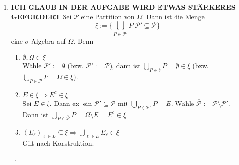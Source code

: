 \documentclass[11pt,a4paper,ngerman]{article}
\begin{document}
\begin{enumerate}[a)]
\begin{enumerate}[(1)]
\item \textbf{ICH GLAUB IN DER AUFGABE WIRD ETWAS STÄRKERES GEFORDERT}
Sei $\mathcal{P}$ eine Partition von $\Omega$. Dann ist die Menge
\begin{equation*}\xi := \{ \bigcup_{P \in \mathcal{P'}} P | \mathcal{P'} \subseteq \mathcal{P} \} \end{equation*}
eine $\sigma$-Algebra auf $\Omega$. Denn

\begin{enumerate}[(1)]
\item $\emptyset, \Omega \in \xi$ \\
Wähle $\mathcal{P'} := \emptyset$ (bzw. $\mathcal{P'} := \mathcal{P}$), dann ist $\bigcup_{P \in \emptyset} P = \emptyset \in \xi$ (bzw. $\bigcup_{P \in \mathcal{P}} P = \Omega \in \xi$).

\item $E \in \xi \Rightarrow E^c \in \xi$ \\
Sei $E \in \xi$. Dann ex. ein $\mathcal{P'} \subseteq \mathcal{P}$ mit $\bigcup_{P \in \mathcal{P'}} P = E$. Wähle $\overline{\mathcal{P}} := \mathcal{P} \setminus \mathcal{P'}$.\\
Dann ist $\bigcup_{P \in \overline{\mathcal{P}}} P = \Omega \setminus E = E^c \in \xi$.

\item $\left( E_\ell \right)_{\ell \in L} \subseteq \xi \Rightarrow \bigcup_{\ell \in L} E_\ell \in \xi$ \\
Gilt nach Konstruktion.
\end{enumerate}
 $\mbox{}$ \hfill $\square$
\end{enumerate}
\end{enumerate}
\end{document}
